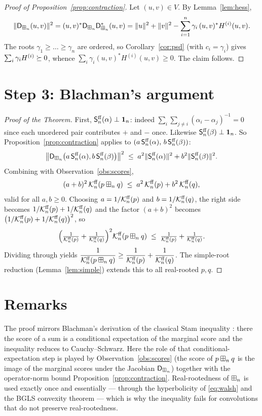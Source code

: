 \documentclass[11pt]{article}
\begin{document}
\begin{proof}[Proof of Proposition~\ref{prop:contraction}]
Let $(u,v)\in V$. By Lemma~\ref{lem:hess},
\[
\|\mathsf{D}_{\boxplus_n}(u,v)\|^2=(u,v)^\ast \mathsf{D}_{\boxplus_n}\mathsf{D}_{\boxplus_n}^\ast(u,v)
=\|u\|^2+\|v\|^2-\sum_{i=1}^n\gamma_i\,(u,v)^\ast H^{(i)}(u,v).
\]
The roots $\gamma_1\ge\dots\ge\gamma_n$ are ordered, so
Corollary~\ref{cor:psd} (with $c_i=\gamma_i$) gives $\sum_i\gamma_i H^{(i)}\succeq 0$,
whence $\sum_i\gamma_i(u,v)^\ast H^{(i)}(u,v)\ge0$. The claim follows.
\end{proof}

\section*{Step 3: Blachman's argument}

\begin{proof}[Proof of the Theorem]
First, $\mathsf{S}^{\mathrm{ff}}_n(\alpha)\perp\mathbf 1_n$: indeed
$\sum_i\sum_{j\ne i}(\alpha_i-\alpha_j)^{-1}=0$ since each unordered pair
contributes $+$ and $-$ once. Likewise $\mathsf{S}^{\mathrm{ff}}_n(\beta)\perp\mathbf 1_n$. So
Proposition~\ref{prop:contraction} applies to
$(a\,\mathsf{S}^{\mathrm{ff}}_n(\alpha),\,b\,\mathsf{S}^{\mathrm{ff}}_n(\beta))$:
\[
\bigl\|\mathsf{D}_{\boxplus_n}\bigl(a\,\mathsf{S}^{\mathrm{ff}}_n(\alpha),b\,\mathsf{S}^{\mathrm{ff}}_n(\beta)\bigr)\bigr\|^2
\;\le\;a^2\|\mathsf{S}^{\mathrm{ff}}_n(\alpha)\|^2+b^2\|\mathsf{S}^{\mathrm{ff}}_n(\beta)\|^2 .
\]
Combining with Observation~\ref{obs:scores},
\[
(a+b)^2\,\mathcal{K}^{\mathrm{ff}}_n(p\boxplus_n q)\;\le\;a^2\,\mathcal{K}^{\mathrm{ff}}_n(p)+b^2\,\mathcal{K}^{\mathrm{ff}}_n(q),
\]
valid for all $a,b\ge0$. Choosing $a=1/\mathcal{K}^{\mathrm{ff}}_n(p)$ and $b=1/\mathcal{K}^{\mathrm{ff}}_n(q)$, the right
side becomes $1/\mathcal{K}^{\mathrm{ff}}_n(p)+1/\mathcal{K}^{\mathrm{ff}}_n(q)$ and the factor $(a+b)^2$ becomes
$\bigl(1/\mathcal{K}^{\mathrm{ff}}_n(p)+1/\mathcal{K}^{\mathrm{ff}}_n(q)\bigr)^2$, so
\[
\Bigl(\tfrac{1}{\mathcal{K}^{\mathrm{ff}}_n(p)}+\tfrac{1}{\mathcal{K}^{\mathrm{ff}}_n(q)}\Bigr)^2\mathcal{K}^{\mathrm{ff}}_n(p\boxplus_n q)
\;\le\;\tfrac{1}{\mathcal{K}^{\mathrm{ff}}_n(p)}+\tfrac{1}{\mathcal{K}^{\mathrm{ff}}_n(q)} .
\]
Dividing through yields
$\dfrac{1}{\mathcal{K}^{\mathrm{ff}}_n(p\boxplus_n q)}\ge\dfrac{1}{\mathcal{K}^{\mathrm{ff}}_n(p)}+\dfrac{1}{\mathcal{K}^{\mathrm{ff}}_n(q)}$.
The simple-root reduction (Lemma~\ref{lem:simple}) extends this to all
real-rooted $p,q$.
\end{proof}

\section*{Remarks}

The proof mirrors Blachman's \cite{Blachman} derivation of the classical Stam
inequality \cite{Stam}: there the score of a sum is a conditional expectation of
the marginal score and the inequality reduces to Cauchy--Schwarz. Here the role
of that conditional-expectation step is played by
Observation~\ref{obs:scores} (the score of $p\boxplus_n q$ is the image of the marginal
scores under the Jacobian $\mathsf{D}_{\boxplus_n}$) together with the operator-norm bound
Proposition~\ref{prop:contraction}. Real-rootedness of $\boxplus_n$ is used exactly
once and essentially — through the hyperbolicity of \eqref{eq:walsh} and the
BGLS convexity theorem — which is why the inequality fails for convolutions that
do not preserve real-rootedness.
\end{document}
